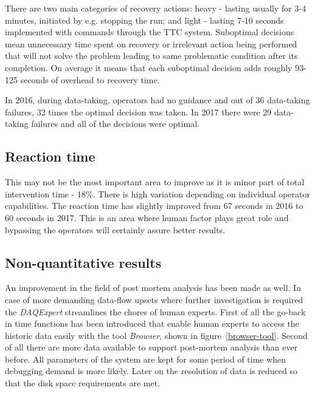 \documentclass[a4paper]{jpconf}
\begin{document}
There are two main categories of recovery actions: heavy - lasting usually for 3-4 minutes, initiated by e.g. stopping the run; and light - lasting 7-10 seconds implemented with commands through the TTC system. Suboptimal decisions mean unnecessary time spent on recovery or irrelevant action being performed that will not solve the problem leading to same problematic condition after its completion. On average it means that each suboptimal decision adds roughly 93-125 seconds of overhead to recovery time.

In 2016, during data-taking, operators had no guidance and out of 36 data-taking failures, 32 times the optimal decision was taken. In 2017 there were 29 data-taking failures and all of the decisions were optimal.

\subsection{Reaction time}

This may not be the most important area to improve as it is minor part of total intervention time - 18\%. There is high variation depending on individual operator capabilities. The reaction time has slightly improved from 67 seconds in 2016 to 60 seconds in 2017. This is an area where human factor plays great role and bypassing the operators will certainly assure better results.


\subsection{Non-quantitative results}
An improvement in the field of post mortem analysis has been made as well. In case of more demanding data-flow upsets where further investigation is required the{ \it DAQExpert} streamlines the chores of human experts. First of all the go-back in time functions has been introduced that enable human experts to access the historic data easily with the tool{ \it Browser}, shown in figure~\ref {browser-tool}. Second of all there are more data available to support post-mortem analysis than ever before. All parameters of the system are kept for some period of time when debugging demand is more likely. Later on the resolution of data is reduced so that the disk space requirements are met.
\end{document}
